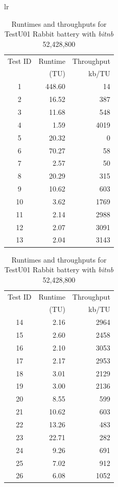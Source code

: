 \documentclass[
  digital,     %
  oneside,     %
  nosansbold,  %
  nocolorbold, %
  nolof,         %
  nolot,         %
]{fithesis4}
\begin{document}
\begin{table}[H]
  \begin{tabularx}{\textwidth}{lr}
    {\begin{tabularx}{0.5\textwidth}{c|r|r}
       Test ID & Runtime & Throughput\\
         & (TU) &  kb/TU\\
        \midrule
        1 & 448.60 & 14 \\
        2 & 16.52 & 387 \\
        3 & 11.68 & 548 \\
        4 & 1.59 & 4019 \\
        5 & 20.32 & 0 \\
        6 & 70.27 & 58 \\
        7 & 2.57 & 50 \\
        8 & 20.29 & 315 \\
        9 & 10.62 & 603 \\
        10 & 3.62 & 1769 \\
        11 & 2.14 & 2988 \\
        12 & 2.07 & 3091 \\
        13 & 2.04 & 3143 \\
    \end{tabularx}} 
    

    {\begin{tabularx}{0.5\textwidth}{c|r|r}
       Test ID & Runtime & Throughput\\
         & (TU) &  kb/TU\\
        \midrule 
        14 & 2.16 & 2964 \\
        15 & 2.60 & 2458 \\
        16 & 2.10 & 3053 \\
        17 & 2.17 & 2953 \\
        18 & 3.01 & 2129 \\
        19 & 3.00 & 2136 \\
        20 & 8.55 & 599 \\
        21 & 10.62 & 603 \\
        22 & 13.26 & 483 \\
        23 & 22.71 & 282 \\
        24 & 9.26 & 691 \\
        25 & 7.02 & 912 \\
        26 & 6.08 & 1052 \\
    \end{tabularx}} 
  \end{tabularx}
  \caption{Runtimes and throughputs for TestU01 Rabbit battery with \emph{bit\textunderscore nb} 52,428,800}
  \label{tab:analysis_rabbit_time}
\end{table}
\end{document}

